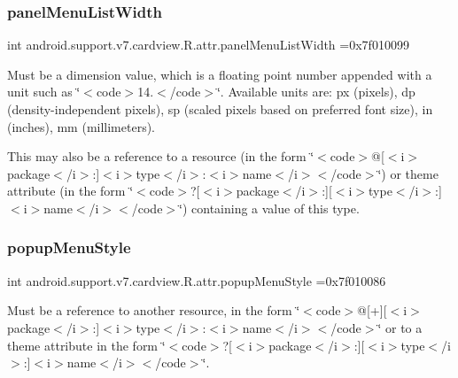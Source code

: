 \subsubsection{\texorpdfstring{panel\+Menu\+List\+Width}{panelMenuListWidth}}
{\footnotesize\ttfamily int android.\+support.\+v7.\+cardview.\+R.\+attr.\+panel\+Menu\+List\+Width =0x7f010099\hspace{0.3cm}{\ttfamily [static]}}

Must be a dimension value, which is a floating point number appended with a unit such as \char`\"{}$<$code$>$14.\+5sp$<$/code$>$\char`\"{}. Available units are\+: px (pixels), dp (density-\/independent pixels), sp (scaled pixels based on preferred font size), in (inches), mm (millimeters). 

This may also be a reference to a resource (in the form \char`\"{}$<$code$>$@\mbox{[}$<$i$>$package$<$/i$>$\+:\mbox{]}$<$i$>$type$<$/i$>$\+:$<$i$>$name$<$/i$>$$<$/code$>$\char`\"{}) or theme attribute (in the form \char`\"{}$<$code$>$?\mbox{[}$<$i$>$package$<$/i$>$\+:\mbox{]}\mbox{[}$<$i$>$type$<$/i$>$\+:\mbox{]}$<$i$>$name$<$/i$>$$<$/code$>$\char`\"{}) containing a value of this type. \mbox{\label{classandroid_1_1support_1_1v7_1_1cardview_1_1R_1_1attr_a3328e29cb8910dba77e81a6963e84125}} 
\subsubsection{\texorpdfstring{popup\+Menu\+Style}{popupMenuStyle}}
{\footnotesize\ttfamily int android.\+support.\+v7.\+cardview.\+R.\+attr.\+popup\+Menu\+Style =0x7f010086\hspace{0.3cm}{\ttfamily [static]}}

Must be a reference to another resource, in the form \char`\"{}$<$code$>$@\mbox{[}+\mbox{]}\mbox{[}$<$i$>$package$<$/i$>$\+:\mbox{]}$<$i$>$type$<$/i$>$\+:$<$i$>$name$<$/i$>$$<$/code$>$\char`\"{} or to a theme attribute in the form \char`\"{}$<$code$>$?\mbox{[}$<$i$>$package$<$/i$>$\+:\mbox{]}\mbox{[}$<$i$>$type$<$/i$>$\+:\mbox{]}$<$i$>$name$<$/i$>$$<$/code$>$\char`\"{}. \mbox{\label{classandroid_1_1support_1_1v7_1_1cardview_1_1R_1_1attr_a6361a1d29dba71235a7925dc34e36e20}} 
